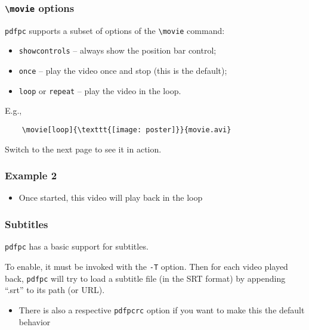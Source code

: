 \documentclass{beamer}
\newcommand{\singleitem}[1]{\begin{itemize}\item #1\end{itemize}}
\newcommand{\pdfpc}{\texttt{pdfpc}\xspace}
\newcommand{\opt}[1]{\texttt{#1}\xspace}
\begin{document}
\begin{frame}[fragile]
  \frametitle{\opt{\textbackslash movie} options}
  
  \pdfpc supports a subset of options of the \opt{\textbackslash movie} command:

  \begin{itemize}
    \item \opt{showcontrols} -- always show the position bar control;
    \item \opt{once} -- play the video once and stop (this is the default);
    \item \opt{loop} or \opt{repeat} -- play the video in the loop.
  \end{itemize}
    
  \vspace{20pt}

  E.g., 
  \begin{lstlisting}
    \movie[loop]{\texttt{[image: poster]}}{movie.avi}
  \end{lstlisting}

  \vspace{10pt}
  Switch to the next page to see it in action.
\end{frame}

\begin{frame}
  \frametitle{Example 2}

  \vspace{10pt}
  \begin{center}
  \end{center}

  \singleitem{Once started, this video will play back in the loop}

\end{frame}

\begin{frame}
  \frametitle{Subtitles}

  \pdfpc has a basic support for subtitles. 
  
  \vspace{10pt}

  To enable, it must be invoked with the \opt{-T} option. Then for each video
  played back, \pdfpc will try to load a subtitle file (in the SRT format) by
  appending ``.srt'' to its path (or URL).
  
  \singleitem{There is also a respective \opt{pdfpcrc} option if you want to
    make this the default behavior}
\end{frame}
\end{document}
